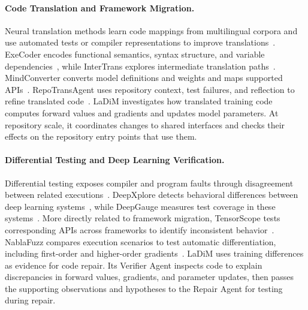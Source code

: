 \documentclass{article}
\begin{document}
\paragraph{Code Translation and Framework Migration.}
Neural translation methods learn code mappings from multilingual corpora and use automated tests or compiler representations to improve translations~\citep{roziere2020transcoder,roziere2021unittests,szafraniec2023compiler}. ExeCoder encodes functional semantics, syntax structure, and variable dependencies~\citep{he-etal-2025-execoder}, while InterTrans explores intermediate translation paths~\citep{macedo2024intertrans}. MindConverter converts model definitions and weights and maps supported APIs~\citep{mindspore2023mindconverter}. RepoTransAgent uses repository context, test failures, and reflection to refine translated code~\citep{guan2025repotransagent}. LaDiM investigates how translated training code computes forward values and gradients and updates model parameters. At repository scale, it coordinates changes to shared interfaces and checks their effects on the repository entry points that use them.

\paragraph{Differential Testing and Deep Learning Verification.}
Differential testing exposes compiler and program faults through disagreement between related executions~\citep{yang2011csmith,le2014emi}. DeepXplore detects behavioral differences between deep learning systems~\citep{pei2017deepxplore}, while DeepGauge measures test coverage in these systems~\citep{ma2018deepgauge}. More directly related to framework migration, TensorScope tests corresponding APIs across frameworks to identify inconsistent behavior~\citep{deng2023tensorscope}. NablaFuzz compares execution scenarios to test automatic differentiation, including first-order and higher-order gradients~\citep{yang2023nablafuzz}. LaDiM uses training differences as evidence for code repair. Its Verifier Agent inspects code to explain discrepancies in forward values, gradients, and parameter updates, then passes the supporting observations and hypotheses to the Repair Agent for testing during repair.
\end{document}
